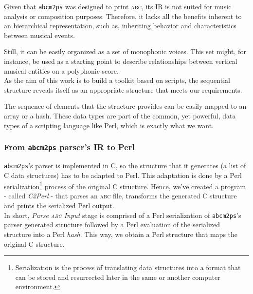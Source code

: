 \documentclass[a4paper,UKenglish]{oasics}
\newcommand{\abc}{\textsc{abc}}
\newcommand{\abcmtops}{\texttt{abcm2ps}}
\begin{document}

    Given that \abcmtops{} was designed to print \abc{}, its IR is not suited for music analysis or
    composition purposes. Therefore, it lacks all the benefits inherent to an hierarchical
    representation, such as, inheriting behavior and characteristics between musical events.

    Still, it can be easily organized as a set of monophonic voices. This set might, for instance,
    be used as a starting point to describe relationships between vertical musical entities on a
    polyphonic score.\\

    As the aim of this work is to build a toolkit based on scripts, the sequential structure reveals
    itself as an appropriate structure that meets our requirements.
    
    The sequence of elements that the structure provides can be easily mapped to an array or a hash.
    These data types are part of the common, yet powerful, data types of a scripting language like
    Perl, which is exactly what we want.

\subsubsection{From \abcmtops{} parser's IR to Perl}

    \abcmtops's parser is implemented in C, so the structure that it generates (a list of C data
    structures) has to be adapted to Perl. This adaptation is done by a Perl
    serialization\footnote{Serialization is the process of translating data structures into a format
    that can be stored and resurrected later in the same or another computer environment.} process
    of the original C structure. Hence, we've created a program - called \emph{C2Perl} - that parses
    an \abc{} file, transforms the generated C structure and prints the serialized Perl output.\\
    
    In short, \emph{Parse \abc{} Input} stage is comprised of a Perl serialization of \abcmtops{}'s
    parser generated structure followed by a Perl evaluation of the serialized structure into a Perl
    \emph{hash}. This way, we obtain a Perl structure that maps the original C structure.\\
\end{document}
